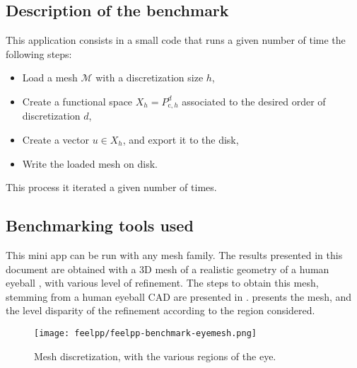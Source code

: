 

\subsection{Description of the benchmark}

This application consists in a small code that runs a given number of time the following steps:
\begin{itemize}
    \item Load a mesh $\mathcal{M}$ with a discretization size $h$,
    \item Create a functional space $X_h = P_{\text{c},h}^d$ associated to the desired order of discretization $d$,
    \item Create a vector $u\in X_h$, and export it to the disk,
    \item Write the loaded mesh on disk.
\end{itemize}

This process it iterated a given number of times.



\subsection{Benchmarking tools used}

This mini app can be run with any mesh family.
The results presented in this document are obtained with a 3D mesh of a realistic geometry of a human eyeball \cite{saigre_model_2024}, with various level of refinement.
The steps to obtain this mesh, stemming from a human eyeball CAD are presented in \cite{chabannes_3d_2024}.
 presents the mesh, and the level disparity of the refinement according to the region considered.

\begin{figure}
  \centering
  \texttt{[image: feelpp/feelpp-benchmark-eyemesh.png]}
  \caption{Mesh discretization, with the various regions of the eye.}
  \label{fig:spec:app-feelpp:eye2brain:mesh}
\end{figure}




